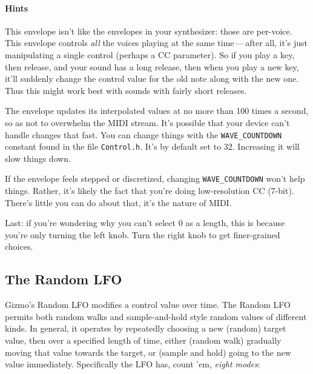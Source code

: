 \documentclass{article}
\begin{document}
\paragraph{Hints}  This envelope isn't like the envelopes in your synthesizer: those are per-voice.  This envelope controls {\it all} the voices playing at the same time\,---\,after all, it's just manipulating a single control (perhaps a CC parameter).  So if you play a key, then release, and your sound has a long release, then when you play a new key, it'll suddenly change the control value for the old note along with the new one.  Thus this might work best with sounds with fairly short releases.

The envelope updates its interpolated values at no more than 100 times a second, so as not to overwhelm the MIDI stream.  It's possible that your device can't handle changes that fast.  You can change things with the \texttt{WAVE\_COUNTDOWN} constant found in the file \texttt{Control.h}. It's by default set to 32.  Increasing it will slow things down.

If the envelope feels stepped or discretized, changing \texttt{WAVE\_COUNTDOWN} won't help things.  Rather, it's likely the fact that you're doing low-resolution CC (7-bit).  There's little you can do about that, it's the nature of MIDI.

Last: if you're wondering why you can't select 0 as a length, this is because you're only turning the left knob.  Turn the right knob to get finer-grained choices.

\subsection{The Random LFO}
\label{randomlfo}

Gizmo's Random LFO modifies a control value over time.  The Random LFO permits both random walks and sample-and-hold style random values of different kinds.  In general, it operates by repeatedly choosing a new (random) target value, then over a specified length of time, either (random walk) gradually moving that value towards the target, or (sample and hold) going to the new value immediately.   Specifically the LFO has, count 'em, {\it eight modes}:
\end{document}
